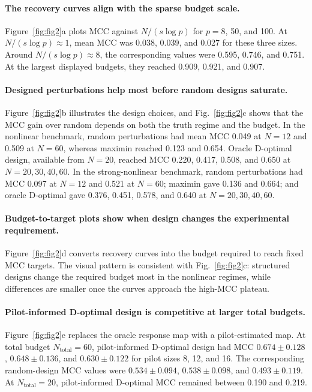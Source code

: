 \paragraph{The recovery curves align with the sparse budget scale.}
Figure~\ref{fig:fig2}a plots MCC against $N/(s\log p)$ for $p=8$, 50, and 100.
At $N/(s\log p)\approx1$, mean MCC was 0.038, 0.039, and 0.027 for these three
sizes. Around $N/(s\log p)\approx8$, the corresponding values were 0.595,
0.746, and 0.751. At the largest displayed budgets, they reached 0.909, 0.921,
and 0.907.

\paragraph{Designed perturbations help most before random designs saturate.}
Figure~\ref{fig:fig2}b illustrates the design choices, and
Fig.~\ref{fig:fig2}c shows that the MCC gain over random depends on both the
truth regime and the budget. In the nonlinear benchmark, random perturbations
had mean MCC 0.049 at $N=12$ and 0.509 at $N=60$, whereas maximin reached 0.123
and 0.654. Oracle D-optimal design, available from $N=20$, reached MCC 0.220,
0.417, 0.508, and 0.650 at $N=20,30,40,60$. In the strong-nonlinear benchmark,
random perturbations had MCC 0.097 at $N=12$ and 0.521 at $N=60$; maximin gave
0.136 and 0.664; and oracle D-optimal gave 0.376, 0.451, 0.578, and 0.640 at
$N=20,30,40,60$.

\paragraph{Budget-to-target plots show when design changes the experimental
requirement.}
Figure~\ref{fig:fig2}d converts recovery curves into the budget required to
reach fixed MCC targets. The visual pattern is consistent with
Fig.~\ref{fig:fig2}c: structured designs change the required budget most in
the nonlinear regimes, while differences are smaller once the curves approach
the high-MCC plateau.

\paragraph{Pilot-informed D-optimal design is competitive at larger total
budgets.}
Figure~\ref{fig:fig2}e replaces the oracle response map with a pilot-estimated
map. At total budget $N_{\mathrm{total}}=60$, pilot-informed D-optimal design
had MCC $0.674\pm0.128$, $0.648\pm0.136$, and $0.630\pm0.122$ for pilot sizes
8, 12, and 16. The corresponding random-design MCC values were
$0.534\pm0.094$, $0.538\pm0.098$, and $0.493\pm0.119$. At
$N_{\mathrm{total}}=20$, pilot-informed D-optimal MCC remained between 0.190
and 0.219.

